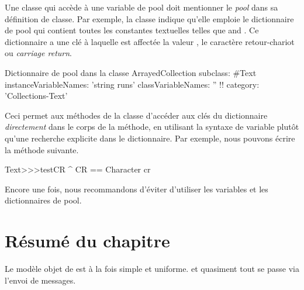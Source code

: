 \documentclass[a4paper,10pt,twoside]{book}
\begin{document}
Une classe qui accède à une variable de pool doit mentionner le \emph{pool}
dans sa définition de classe.
Par exemple, la classe  indique qu'elle emploie le dictionnaire
de pool  qui contient toutes les constantes textuelles
telles que 
 and . 
Ce dictionnaire a une clé  à laquelle est affectée la valeur
, \ie le caractère retour-chariot ou \emph{carriage return}.

\begin{classdef}[textpooldict]{Dictionnaire de pool dans la classe }
ArrayedCollection subclass: #Text
        instanceVariableNames: 'string runs' 	
        classVariableNames: '' 	
        !!
        category: 'Collections-Text'
\end{classdef}
   
Ceci permet aux méthodes de la classe  d'accéder aux clés
du dictionnaire \emph{directement} dans le corps de la méthode, \ie 
en utilisant la syntaxe de variable plutôt qu'une recherche explicite
dans le dictionnaire.
Par exemple, nous pouvons écrire la méthode suivante.

\begin{method}[texttestcr]{}
Text>>>testCR 	
      ^ CR == Character cr
\end{method}

Encore une fois, nous recommandons d'éviter d'utiliser
les variables et les dictionnaires de pool.

\section{Résumé du chapitre}

Le modèle objet de \pharo est à la fois simple et uniforme.
\Mantra et quasiment tout se passe via l'envoi de messages. %
\end{document}
